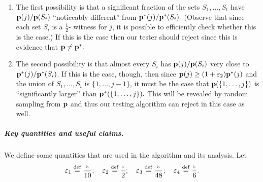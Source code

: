 \begin{enumerate}
  

\item The first possibility is that a significant fraction of the
sets $S_1,\dots,S_t$ have $\mathbf{p}(j)/\mathbf{p}(S_i)$ ``noticeably
different'' from $\mathbf{p}^\ast(j)/\mathbf{p}^\ast(S_i).$
(Observe that since each set $S_i$ is a ${\frac{1}2}$-\good
witness for $j$, it is possible to efficiently check whether this is the
case.)  If this is the case then our tester should reject since
this is evidence that $\mathbf{p} \neq \mathbf{p}^\ast.$

\item The second possibility is that almost every
$S_i$ has $\mathbf{p}(j)/\mathbf{p}(S_i)$ very close to $\mathbf{p}^\ast(j)/\mathbf{p}^\ast(S_i)$.
If this is the case, though, then since
$\mathbf{p}(j) \geq (1+{\varepsilon_2})\mathbf{p}^\ast(j)$ and the union of
$S_1,\dots,S_t$ is $\{1,\dots,j-1\}$, it must be the case that
$\mathbf{p}(\{1,\dots,j\})$ is ``significantly larger'' than $\mathbf{p}^\ast(\{1,\dots,j\}).$
This will be revealed by random sampling from $\mathbf{p}$ and thus our
testing algorithm can reject in this case as well.
\end{enumerate}

\subparagraph{Key quantities and useful claims.}
We define some quantities that are used in the algorithm and its analysis.
Let
\begin{equation}
\label{eq:choice:epsilons}
{\eps_1} \eqdef {\frac{\eps}{10}}; \quad
{\eps_2} \eqdef {\frac{\eps}{2}}; \quad
{\eps_3} \eqdef {\frac{\eps}{48}}; \quad
{\eps_4}  \eqdef {\frac{\eps}{6}}.
\end{equation}

